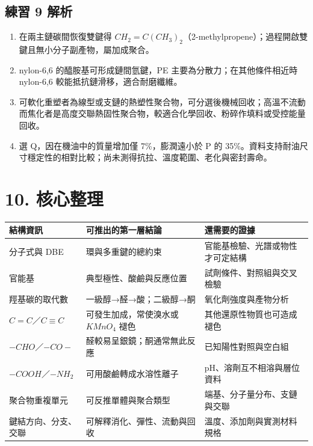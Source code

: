 \documentclass[11pt,a4paper]{article}
\newcounter{none}
\providecommand{\tightlist}{%
  \setlength{\itemsep}{0pt}\setlength{\parskip}{0pt}}
\begin{document}
\subsection{練習 9 解析}\label{ux7df4ux7fd2-9-ux89e3ux6790}

\begin{enumerate}
\def\labelenumi{\arabic{enumi}.}
\tightlist
\item
  在兩主鏈碳間恢復雙鍵得 \(CH_2=C(CH_3)_2\)（2-methylpropene）；過程開啟雙鍵且無小分子副產物，屬加成聚合。
\item
  nylon-6,6 的醯胺基可形成鏈間氫鍵，PE 主要為分散力；在其他條件相近時 nylon-6,6 較能抵抗鏈滑移，適合耐磨纖維。
\item
  可軟化重塑者為線型或支鏈的熱塑性聚合物，可分選後機械回收；高溫不流動而焦化者是高度交聯熱固性聚合物，較適合化學回收、粉碎作填料或受控能量回收。
\item
  選 Q，因在機油中的質量增加僅 7\%，膨潤遠小於 P 的 35\%。資料支持耐油尺寸穩定性的相對比較；尚未測得抗拉、溫度範圍、老化與密封壽命。
\end{enumerate}

\section{10. 核心整理}\label{ux6838ux5fc3ux6574ux7406}

{\def\LTcaptype{none} %
\begin{longtable}[]{@{}
  >{\raggedright\arraybackslash}p{}
  >{\raggedright\arraybackslash}p{}
  >{\raggedright\arraybackslash}p{}@{}}
\toprule\noalign{}
\begin{minipage}[b]{\linewidth}\raggedright
結構資訊
\end{minipage} & \begin{minipage}[b]{\linewidth}\raggedright
可推出的第一層結論
\end{minipage} & \begin{minipage}[b]{\linewidth}\raggedright
還需要的證據
\end{minipage} \\
\midrule\noalign{}
\endhead
\bottomrule\noalign{}
\endlastfoot
分子式與 DBE & 環與多重鍵的總約束 & 官能基檢驗、光譜或物性才可定結構 \\
官能基 & 典型極性、酸鹼與反應位置 & 試劑條件、對照組與交叉檢驗 \\
羥基碳的取代數 & 一級醇→醛→酸；二級醇→酮 & 氧化劑強度與產物分析 \\
\(C=C\)／\(C\equiv C\) & 可發生加成，常使溴水或 \(KMnO_4\) 褪色 & 其他還原性物質也可造成褪色 \\
\(-CHO\)／\(-CO-\) & 醛較易呈銀鏡；酮通常無此反應 & 已知陽性對照與空白組 \\
\(-COOH\)／\(-NH_2\) & 可用酸鹼轉成水溶性離子 & pH、溶劑互不相溶與層位資料 \\
聚合物重複單元 & 可反推單體與聚合類型 & 端基、分子量分布、支鏈與交聯 \\
鍵結方向、分支、交聯 & 可解釋消化、彈性、流動與回收 & 溫度、添加劑與實測材料規格 \\
\end{longtable}
}
\end{document}
